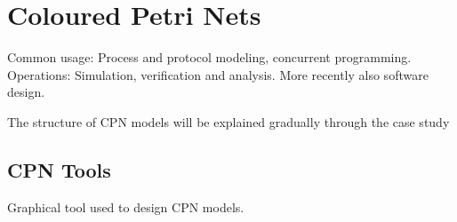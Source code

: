 \section{Coloured Petri Nets}

Common usage: Process and protocol modeling, concurrent programming. Operations:
Simulation, verification and analysis. More recently also software design.

The structure of CPN models will be explained gradually through the case study 

\subsection{CPN Tools}

Graphical tool used to design CPN models. 

\begin{comment}

\subsection{CPN ML}
	


		
		The simple types available are unit, boolean, integer, string, enumerated
		and index. A unit can have one value: |()|. Enumerated colour sets
		can have specified values, while index colour sets define an indexed range of
		values. 
		
		The compound types are:
		\begin{description}
		\item[Product] A combination of colour sets separated by |*|. The
		postal code and city example from earlier would be
		|product INT*STRING|, and a colour would be (5055,''Bergen'');
		\item[List] A list of items that belong to the same colour set.
		\item[Record] Similar to a product, but each element is named. The postal code
		and city example would give \lstinline-record Code:INT*City:STRING- and a
		colour would be |{Code=5055,City="Bergen"}|
		\item[Union] This is used if a place should be able to contain colours from
		different colour sets, or if such colours should be handled in the same way at a
		point in the model. They can also contain simple identifiers, like an
		enumeration. An example is shown in Listing \ref{lst:overview_colset}.
		\end{description}
		
		For full syntax definition, please refer to the CPN Tools
		documentation. (ref?)

\end{comment}
